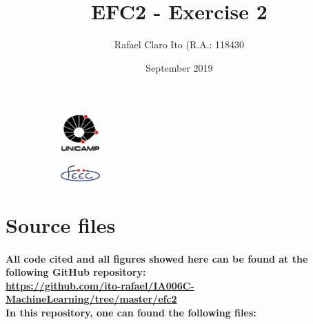 \documentclass[a4paper]{article}
\begin{document}
\begin{figure}
    \centering
    \begin{subfigure}{0.45\textwidth}
        \centering
        \includegraphics[width=1.5cm]{unicamp}
        \label{fig:unicamp}
    \end{subfigure}
    \hfill
    \begin{subfigure}{0.45\textwidth}
        \centering
        \includegraphics[width=1.5cm]{feec}
        \label{fig:feec}
    \end{subfigure}
\end{figure}

\title{EFC2 - Exercise 2}
\author{Rafael Claro Ito (R.A.: 118430}
\date{September 2019}
\maketitle
\newpage

\section{Source files}

\paragraph{All code cited and all figures showed here can be found at the following GitHub repository:\\
\url{https://github.com/ito-rafael/IA006C-MachineLearning/tree/master/efc2}\\
In this repository, one can found the following files:\\}
\end{document}
